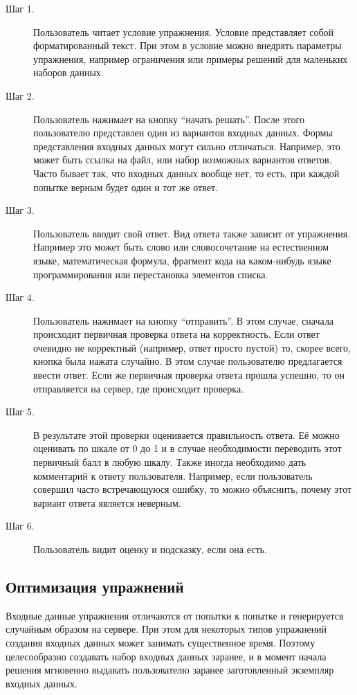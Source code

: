 \documentclass{matmex-diploma-custom}
\begin{document}
\begin{description}
\item[Шаг 1.] Пользователь читает условие упражнения. Условие
  представляет собой форматированный текст. При этом в условие можно
  внедрять параметры упражнения, например ограничения или примеры
  решений для маленьких наборов данных.

\item[Шаг 2.] Пользователь нажимает на кнопку ``начать решать''.
  После этого пользователю представлен один из вариантов входных
  данных. Формы представления входных данных могут сильно
  отличаться. Например, это может быть ссылка на файл, или
  набор возможных вариантов ответов. Часто бывает так, что входных
  данных вообще нет, то есть, при каждой попытке верным будет один и тот
  же ответ.
\item[Шаг 3.] Пользователь вводит свой ответ. Вид ответа также
  зависит от упражнения. Например это может быть слово или
  словосочетание на естественном языке, математическая формула, фрагмент
  кода на каком-нибудь языке программирования или перестановка элементов
  списка.
\item[Шаг 4.] Пользователь нажимает на кнопку ``отправить''. В этом
  случае, сначала происходит первичная проверка ответа на
  корректность. Если ответ очевидно не корректный (например, ответ
  просто пустой) то, скорее всего, кнопка была нажата случайно. В этом
  случае пользователю предлагается ввести ответ. Если же первичная
  проверка ответа прошла успешно, то он отправляется на сервер, где
  происходит проверка.
\item[Шаг 5.] В результате этой проверки оценивается правильность
  ответа. Её можно оценивать по шкале от 0 до 1 и в случае
  необходимости переводить этот первичный балл в любую шкалу. Также
  иногда необходимо дать комментарий к ответу пользователя. Например,
  если пользователь совершил часто встречающуюся ошибку, то можно
  объяснить, почему этот вариант ответа является неверным.
\item[Шаг 6.] Пользователь видит оценку и подсказку, если она есть.
\end{description}

\subsection{Оптимизация упражнений}
Входные данные упражнения отличаются от попытки к попытке и
генерируется случайным образом на сервере. При этом для некоторых
типов упражнений создания входных данных может занимать существенное
время. Поэтому целесообразно создавать набор входных данных заранее, и
в момент начала решения мгновенно выдавать пользователю заранее
заготовленный экземпляр входных данных.
\end{document}
